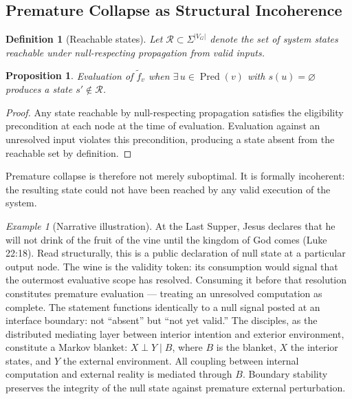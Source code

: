 \documentclass[11pt]{article}
\newtheorem{definition}{Definition}
\newtheorem{proposition}{Proposition}
\theoremstyle{remark}
\newtheorem*{example*}{Example}
\begin{document}
\subsection{Premature Collapse as Structural Incoherence}

\begin{definition}[Reachable states]
Let $\mathcal{R} \subset \Sigma^{|V_G|}$ denote the set of system states reachable under null-respecting propagation from valid inputs.
\end{definition}

\begin{proposition}
Evaluation of $\tilde{f}_v$ when $\exists\, u \in \operatorname{Pred}(v)$ with $s(u) = \varnothing$ produces a state $s' \notin \mathcal{R}$.
\end{proposition}

\begin{proof}
Any state reachable by null-respecting propagation satisfies the eligibility precondition at each node at the time of evaluation. Evaluation against an unresolved input violates this precondition, producing a state absent from the reachable set by definition.
\end{proof}

Premature collapse is therefore not merely suboptimal. It is formally incoherent: the resulting state could not have been reached by any valid execution of the system.

\begin{example*}[Narrative illustration]
At the Last Supper, Jesus declares that he will not drink of the fruit of the vine until the kingdom of God comes (Luke 22:18). Read structurally, this is a public declaration of null state at a particular output node. The wine is the validity token: its consumption would signal that the outermost evaluative scope has resolved. Consuming it before that resolution constitutes premature evaluation --- treating an unresolved computation as complete. The statement functions identically to a null signal posted at an interface boundary: not ``absent'' but ``not yet valid.'' The disciples, as the distributed mediating layer between interior intention and exterior environment, constitute a Markov blanket: $X \perp Y \mid B$, where $B$ is the blanket, $X$ the interior states, and $Y$ the external environment. All coupling between internal computation and external reality is mediated through $B$. Boundary stability preserves the integrity of the null state against premature external perturbation.
\end{example*}
\end{document}
